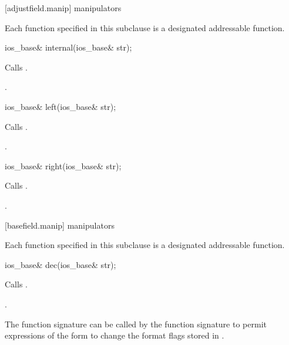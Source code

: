 [adjustfield.manip]{ manipulators}

\pnum
Each function specified in this subclause
is a designated addressable function.

%
\begin{itemdecl}
ios_base& internal(ios_base& str);
\end{itemdecl}

\begin{itemdescr}
\pnum
\effects
Calls
.

\pnum
\returns
{}.
\end{itemdescr}

%
\begin{itemdecl}
ios_base& left(ios_base& str);
\end{itemdecl}

\begin{itemdescr}
\pnum
\effects
Calls
.

\pnum
\returns
{}.
\end{itemdescr}

%
\begin{itemdecl}
ios_base& right(ios_base& str);
\end{itemdecl}

\begin{itemdescr}
\pnum
\effects
Calls
.

\pnum
\returns
{}.
\end{itemdescr}

[basefield.manip]{ manipulators}

\pnum
Each function specified in this subclause
is a designated addressable function.

%
\begin{itemdecl}
ios_base& dec(ios_base& str);
\end{itemdecl}

\begin{itemdescr}
\pnum
\effects
Calls
.

\pnum
\returns
{}.
\begin{footnote}
The function signature
can be called by
the function signature
to permit expressions of the form
to change the format flags stored in
.
\end{footnote}
\end{itemdescr}

